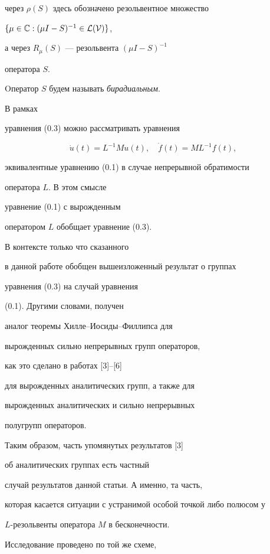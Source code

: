 через $\rho (S)$ здесь обозначено резольвентное множество


$\{\mu\in {\Bbb C}:(\mu I-S)^{-1}\in {\cal L(\cal V)}\}$,


а через $R_{\mu }(S)$ --- резольвента $(\mu I-S)^{-1}$


оператора $S$.


Oператор $S$ будем называть {\it бирадиальным}.





В рамках


уравнения (0.3) можно рассматривать уравнения


$$


\Dot u(t)=L^{-1}Mu(t),\quad \Dot f(t)=ML^{-1}f(t),


$$


эквивалентные уравнению (0.1) в случае непрерывной обратимости


оператора $L$. В этом смысле


уравнение (0.1) с вырожденным


оператором $L$ обобщает уравнение (0.3).


В контексте только что сказанного


в данной работе обобщен вышеизложенный результат о группах


уравнения (0.3) на случай уравнения


(0.1). Другими словами, получен


аналог теоремы Хилле--Иосиды--Филлипса для


вырожденных сильно непрерывных групп операторов,


как это сделано в работах  [3]--[6]


для вырожденных аналитических групп, а также для


вырожденных аналитических и сильно непрерывных


полугрупп операторов.


Таким образом, часть упомянутых результатов [3]


об аналитических группах есть частный


случай результатов данной статьи. А именно, та часть,


которая касается ситуации с устранимой особой точкой либо полюсом у


$L$-резольвенты оператора $M$ в бесконечности.





Исследование проведено  по той же схеме,


